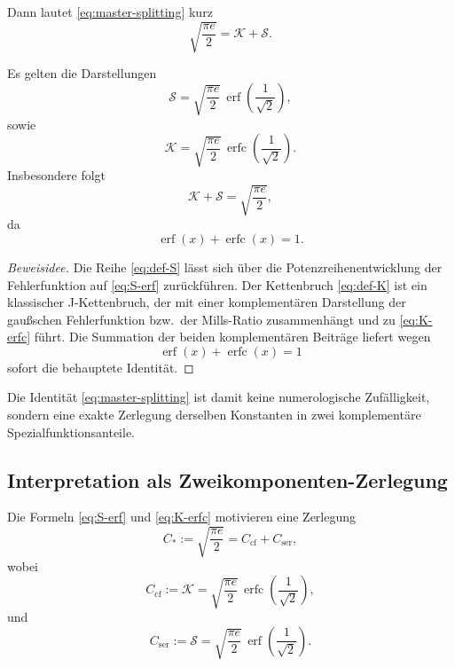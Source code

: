 \documentclass[12pt,a4paper]{article}
\begin{document}
	Dann lautet \eqref{eq:master-splitting} kurz
	\begin{equation}
		\sqrt{\frac{\pi e}{2}}=\mathcal K+\mathcal S.
	\end{equation}
	
	\begin{proposition}
		Es gelten die Darstellungen
		\begin{equation}
			\mathcal S
			=
			\sqrt{\frac{\pi e}{2}}\,
			\operatorname{erf}\!\left(\frac{1}{\sqrt2}\right),
			\label{eq:S-erf}
		\end{equation}
		sowie
		\begin{equation}
			\mathcal K
			=
			\sqrt{\frac{\pi e}{2}}\,
			\operatorname{erfc}\!\left(\frac{1}{\sqrt2}\right).
			\label{eq:K-erfc}
		\end{equation}
		Insbesondere folgt
		\begin{equation}
			\mathcal K+\mathcal S
			=
			\sqrt{\frac{\pi e}{2}},
		\end{equation}
		da
		\begin{equation}
			\operatorname{erf}(x)+\operatorname{erfc}(x)=1.
		\end{equation}
	\end{proposition}
	
	\begin{proof}[Beweisidee]
		Die Reihe \eqref{eq:def-S} lässt sich über die Potenzreihenentwicklung der Fehlerfunktion auf \eqref{eq:S-erf} zurückführen. Der Kettenbruch \eqref{eq:def-K} ist ein klassischer J-Kettenbruch, der mit einer komplementären Darstellung der gaußschen Fehlerfunktion bzw.\ der Mills-Ratio zusammenhängt und zu \eqref{eq:K-erfc} führt. Die Summation der beiden komplementären Beiträge liefert wegen
		\[
		\operatorname{erf}(x)+\operatorname{erfc}(x)=1
		\]
		sofort die behauptete Identität.
	\end{proof}
	
	\begin{remark}
		Die Identität \eqref{eq:master-splitting} ist damit keine numerologische Zufälligkeit, sondern eine exakte Zerlegung derselben Konstanten in zwei komplementäre Spezialfunktionsanteile.
	\end{remark}
	
	\subsection{Interpretation als Zweikomponenten-Zerlegung}
	
	Die Formeln \eqref{eq:S-erf} und \eqref{eq:K-erfc} motivieren eine Zerlegung
	\begin{equation}
		C_*:=\sqrt{\frac{\pi e}{2}}=C_{\mathrm{cf}}+C_{\mathrm{ser}},
	\end{equation}
	wobei
	\begin{equation}
		C_{\mathrm{cf}}:=\mathcal K
		=
		\sqrt{\frac{\pi e}{2}}\,
		\operatorname{erfc}\!\left(\frac{1}{\sqrt2}\right),
	\end{equation}
	und
	\begin{equation}
		C_{\mathrm{ser}}:=\mathcal S
		=
		\sqrt{\frac{\pi e}{2}}\,
		\operatorname{erf}\!\left(\frac{1}{\sqrt2}\right).
	\end{equation}
	
\end{document}
